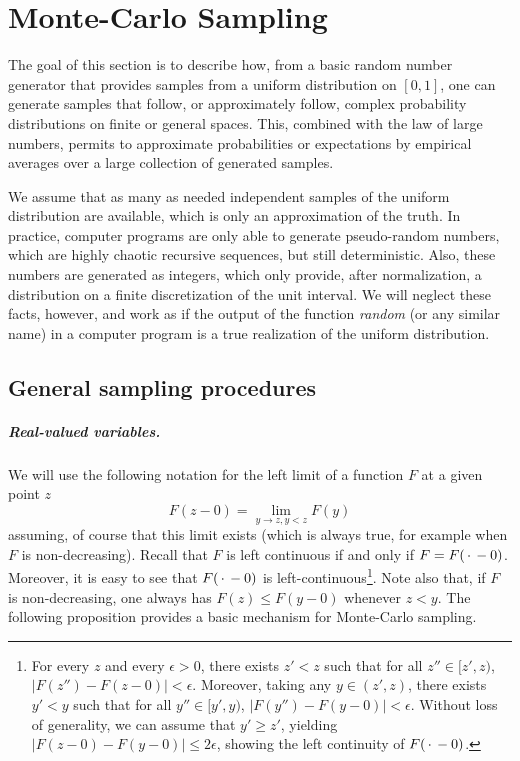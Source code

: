 \chapter{Monte-Carlo Sampling}
\label{chap:mcmc}

The goal of this section is to describe how, from a basic random
number generator that provides samples from a uniform distribution on $[0,1]$, one
can generate samples that follow, or
approximately follow, complex probability distributions on finite or general spaces. This,
combined with the law of large numbers, permits to 
approximate probabilities or expectations by empirical averages over
a large collection of generated samples.

We assume that as many as needed independent samples of the uniform distribution are
available, which is only an approximation of the truth. In practice,
computer programs are only able to generate pseudo-random numbers,
which are highly chaotic recursive sequences, but still
deterministic. Also, these numbers are generated as integers, which
only provide, after normalization, a distribution on a finite discretization
of the unit interval. We will neglect these facts, however, and work
as if the output of the function {\em random} (or any similar name) in
a computer program is a true realization of the uniform distribution.


\section{General sampling procedures}
\label{sec:gen.samp}
\paragraph{Real-valued variables.}
We will use the following notation for the left limit of a function $F$ at a given point $z$ 
\[
F(z-0) = \lim_{y\to z, y<z} F(y)
\]
assuming, of course that this limit exists (which is always true, for example when $F$ is non-decreasing). 
Recall that $F$ is left continuous if and only if  $F=F(\,\cdot\,-0)$. Moreover, it is easy to see that $F(\,\cdot\,-0)$ is left-continuous\footnote{ For every $z$ and every $\epsilon>0$, there exists $z'<z$ such that for all $z''\in [z', z)$, $|F(z'') - F(z-0)| < \epsilon$. Moreover, taking any $y\in (z', z)$, there exists $y'<y$ such that for all $y''\in [y', y)$, $|F(y'') - F(y-0)| < \epsilon$. Without loss of generality, we can assume that $y'\geq z'$, yielding $|F(z-0) - F(y-0)| \leq 2\epsilon$, showing the left continuity of $F(\,\cdot\,-0)$.}. 
Note also that, if $F$ is non-decreasing, one always has $F(z) \leq F(y-0)$ whenever $z < y$. The following proposition provides a basic mechanism for Monte-Carlo sampling.


